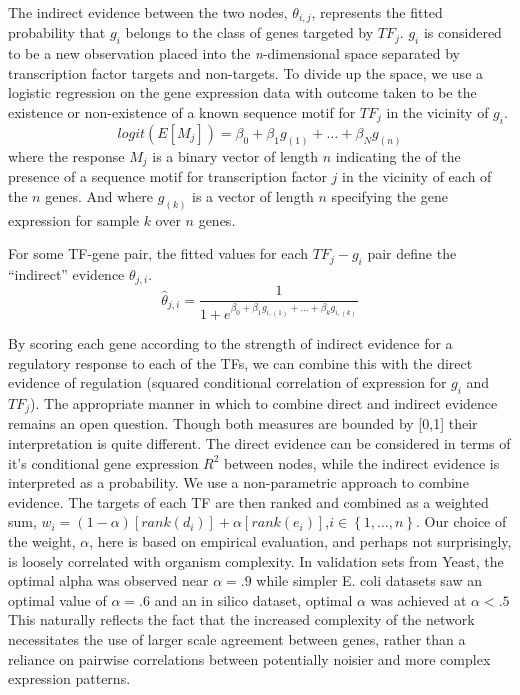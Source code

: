 \documentclass[9pt,twocolumn,twoside]{pnas-new}
\begin{document}
The indirect evidence between the two nodes, $\theta_{i,j}$, represents
the fitted probability that $g_{i}$ belongs to the class of genes
targeted by $TF_{j}$. $g_{i}$ is considered to be a new observation
placed into the \emph{n}-dimensional space separated by transcription
factor targets and non-targets. To divide up the space, we use a logistic
regression on the gene expression data with outcome taken to be the
existence or non-existence of a known sequence motif for $TF_{j}$
in the vicinity of $g_{i}$. 
\[
logit\left(E\left[M_{j}\right]\right)=\beta_{0}+\beta_{1}g_{\left(1\right)}+\dots+\beta_{N}g_{\left(n\right)}
\]
where the response $M_{j}$ is a binary vector of length $n$ indicating
the of the presence of a sequence motif for transcription factor $j$
in the vicinity of each of the $n$ genes. And where $g_{\left(k\right)}$
is a vector of length $n$ specifying the gene expression for sample
$k$ over $n$ genes. 

For some TF-gene pair, the fitted values for each $TF_{j}-g_{i}$
pair define the ``indirect'' evidence $\theta_{j,i}$.
\[
\hat{\theta}_{j,i}=\frac{1}{1+e^{\beta_{0}+\beta_{1}g_{i,\left(1\right)}+\dots+\beta_{k}g_{i,\left(k\right)}}}
\]

By scoring each gene according to the strength of indirect evidence
for a regulatory response to each of the TFs, we can combine this
with the direct evidence of regulation (squared conditional correlation
of expression for $g_{i}$ and $TF_{j}$). The appropriate manner
in which to combine direct and indirect evidence remains an open question.
Though both measures are bounded by {[}0,1{]} their interpretation
is quite different. The direct evidence can be considered in terms
of it's conditional gene expression $R^{2}$ between nodes, while
the indirect evidence is interpreted as a probability. We use a non-parametric
approach to combine evidence. The targets of each TF are then ranked
and combined as a weighted sum, $w_{i}=\left(1-\alpha\right)\left[rank\left(d_{i}\right)\right]+\alpha\left[rank\left(e_{i}\right)\right]$,$i\in\left\{ 1,\dots,n\right\} $.
Our choice of the weight, $\alpha$, here is based on empirical evaluation,
and perhaps not surprisingly, is loosely correlated with organism
complexity. In validation sets from Yeast, the optimal alpha was observed
near $\alpha=.9$ while simpler E. coli datasets saw an optimal value
of $\alpha=.6$ and an in silico dataset, optimal $\alpha$ was achieved
at $\alpha<.5$ This naturally reflects the fact that the increased
complexity of the network necessitates the use of larger scale agreement
between genes, rather than a reliance on pairwise correlations between
potentially noisier and more complex expression patterns. 
\end{document}
